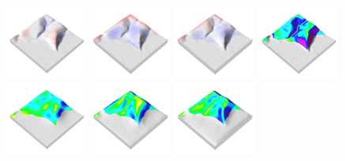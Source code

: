 \documentclass[prodmode,acmtochi]{acmsmall} %
\begin{document}
\begin{figure}[h!]
\begin{center}
		\includegraphics[width=0.24\textwidth]{images/render_3d/mean_dem_regression_difference_1.png}
		\includegraphics[width=0.24\textwidth]{images/render_3d/mean_dem_regression_difference_2.png}
		\includegraphics[width=0.24\textwidth]{images/render_3d/mean_dem_regression_difference_3.png}
		\includegraphics[width=0.24\textwidth]{images/render_3d/slope_1.png}
		\includegraphics[width=0.24\textwidth]{images/render_3d/mean_slope_1.png}
		\includegraphics[width=0.24\textwidth]{images/render_3d/mean_slope_2.png}
		\includegraphics[width=0.24\textwidth]{images/render_3d/mean_slope_3.png}

\end{center}
\end{figure}
\end{document}
